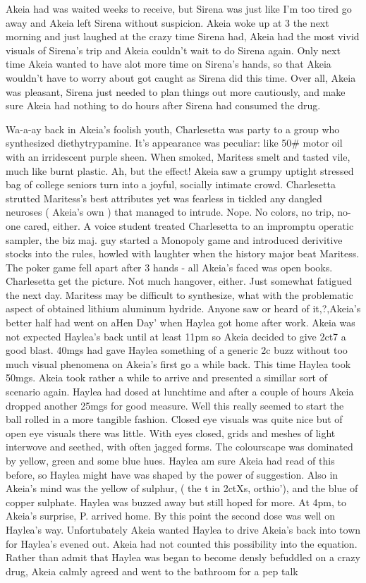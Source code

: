 \documentclass[12pt]{book}
\begin{document}
Akeia had was waited weeks to receive, but Sirena was just like I'm too tired go away and Akeia left Sirena without suspicion. Akeia woke up at 3 the next morning and just laughed at the crazy time Sirena had, Akeia had the most vivid visuals of Sirena's trip and Akeia couldn't wait to do Sirena again. Only next time Akeia wanted to have alot more time on Sirena's hands, so that Akeia wouldn't have to worry about got caught as Sirena did this time. Over all, Akeia was pleasant, Sirena just needed to plan things out more cautiously, and make sure Akeia had nothing to do hours after Sirena had consumed the drug.



Wa-a-ay back in Akeia's foolish youth, Charlesetta was party to a group who synthesized diethytrypamine. It's appearance was peculiar: like 50\# motor oil with an irridescent purple sheen. When smoked, Maritess smelt and tasted vile, much like burnt plastic. Ah, but the effect! Akeia saw a grumpy uptight stressed bag of college seniors turn into a joyful, socially intimate crowd. Charlesetta strutted Maritess's best attributes yet was fearless in tickled any dangled neuroses ( Akeia's own ) that managed to intrude. Nope. No colors, no trip, no-one cared, either. A voice student treated Charlesetta to an impromptu operatic sampler, the biz maj. guy started a Monopoly game and introduced derivitive stocks into the rules, howled with laughter when the history major beat Maritess. The poker game fell apart after 3 hands - all Akeia's faced was open books. Charlesetta get the picture. Not much hangover, either. Just somewhat fatigued the next day. Maritess may be difficult to synthesize, what with the problematic aspect of obtained lithium aluminum hydride. Anyone saw or heard of it,?,Akeia's better half had went on aHen Day' when Haylea got home after work. Akeia was not expected Haylea's back until at least 11pm so Akeia decided to give 2ct7 a good blast. 40mgs had gave Haylea something of a generic 2c buzz without too much visual phenomena on Akeia's first go a while back. This time Haylea took 50mgs. Akeia took rather a while to arrive and presented a simillar sort of scenario again. Haylea had dosed at lunchtime and after a couple of hours Akeia dropped another 25mgs for good measure. Well this really seemed to start the ball rolled in a more tangible fashion. Closed eye visuals was quite nice but of open eye visuals there was little. With eyes closed, grids and meshes of light interwove and seethed, with often jagged forms. The colourscape was dominated by yellow, green and some blue hues. Haylea am sure Akeia had read of this before, so Haylea might have was shaped by the power of suggestion. Also in Akeia's mind was the yellow of sulphur, ( the t in 2ctXs, orthio'), and the blue of copper sulphate. Haylea was buzzed away but still hoped for more. At 4pm, to Akeia's surprise, P. arrived home. By this point the second dose was well on Haylea's way. Unfortubately Akeia wanted Haylea to drive Akeia's back into town for Haylea's evened out. Akeia had not counted this possibility into the equation. Rather than admit that Haylea was began to become densly befuddled on a crazy drug, Akeia calmly agreed and went to the bathroom for a pep talk 
\end{document}
